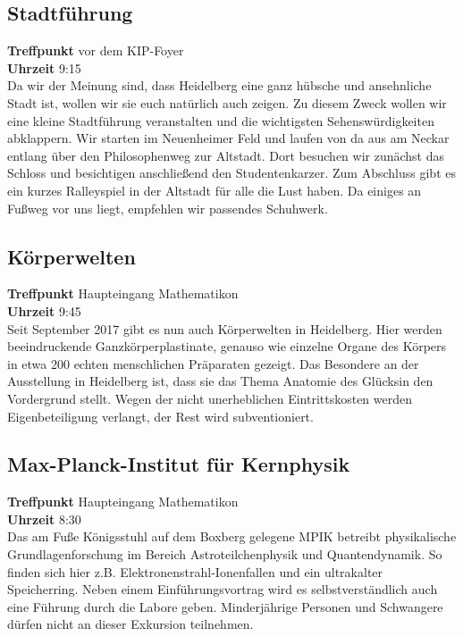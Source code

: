 \subsection*{Stadtführung}
\textbf{Treffpunkt} vor dem KIP-Foyer\\
\textbf{Uhrzeit} 9:15\\
Da wir der Meinung sind, dass Heidelberg eine ganz hübsche und ansehnliche Stadt ist, wollen wir sie euch natürlich auch zeigen. Zu diesem Zweck wollen wir eine kleine Stadtführung veranstalten und die wichtigsten Sehenswürdigkeiten abklappern. Wir starten im  Neuenheimer Feld und laufen von da aus am Neckar entlang über den Philosophenweg zur Altstadt. Dort besuchen wir zunächst das Schloss und besichtigen anschließend den Studentenkarzer. Zum Abschluss gibt es ein kurzes Ralleyspiel in der Altstadt für alle die Lust haben. Da einiges an Fußweg vor uns liegt, empfehlen wir passendes Schuhwerk. 

\subsection*{Körperwelten}
\textbf{Treffpunkt} Haupteingang Mathematikon\\
\textbf{Uhrzeit} 9:45\\
Seit September 2017 gibt es nun auch Körperwelten in Heidelberg. Hier werden beeindruckende Ganzkörperplastinate, genauso wie einzelne Organe des Körpers in etwa 200 echten menschlichen Präparaten gezeigt. Das Besondere an der Ausstellung in Heidelberg ist, dass sie das Thema \flqq Anatomie des Glücks\frqq in den Vordergrund stellt. Wegen der nicht unerheblichen Eintrittskosten werden  Eigenbeteiligung verlangt, der Rest wird subventioniert. 

\subsection*{Max-Planck-Institut für Kernphysik}
\textbf{Treffpunkt} Haupteingang Mathematikon\\
\textbf{Uhrzeit} 8:30\\
Das am Fuße Königsstuhl auf dem Boxberg gelegene MPIK betreibt physikalische Grundlagenforschung im Bereich Astroteilchenphysik und Quantendynamik. So finden sich hier z.B. Elektronenstrahl-Ionenfallen und ein ultrakalter Speicherring. Neben einem Einführungsvortrag wird es selbstverständlich auch eine Führung durch die Labore geben. Minderjährige Personen und Schwangere dürfen nicht an dieser Exkursion teilnehmen. 

